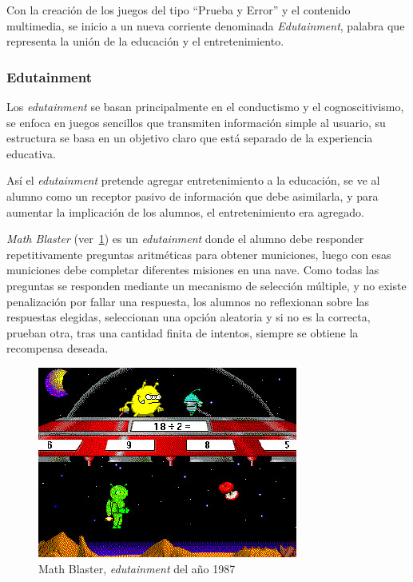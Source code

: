 Con la creación de los juegos del tipo \enquote{Prueba y Error} y el contenido
multimedia, se inicio a un nueva corriente denominada \emph{Edutainment},
palabra que representa la unión de la educación y el entretenimiento. 

\subsubsection{Edutainment}
\label{sec:edutainment}


Los \emph{edutainment} se basan principalmente en el conductismo y el
cognoscitivismo, se enfoca en juegos sencillos que transmiten información simple
al usuario, su estructura se basa en un objetivo claro que está separado de la
experiencia educativa\cite{egenfeldt2007third}. 

Así el \emph{edutainment} pretende agregar entretenimiento a la educación, se
ve al alumno como un receptor pasivo de información que debe asimilarla, y para
aumentar la implicación de los alumnos, el entretenimiento era
agregado\cite{resnick:2004}.


\emph{Math Blaster} (ver~\ref{fig:math_blaster}) es un \emph{edutainment} donde
el alumno debe responder repetitivamente preguntas aritméticas para obtener
municiones, luego con esas municiones debe completar diferentes misiones en una
nave\cite{bruckman1999can}. Como todas las preguntas se responden mediante un
mecanismo de selección múltiple, y no existe penalización por fallar una
respuesta, los alumnos no reflexionan sobre las respuestas elegidas, seleccionan
una opción aleatoria y si no es la correcta, prueban otra, tras una cantidad
finita de intentos, siempre se obtiene la recompensa deseada.

\begin{figure}[ht!] 
\centering 
\includegraphics[scale=0.5,natwidth=296,natheight=217]{tics/images/math_blaster.jpg}
\caption{Math Blaster, \emph{edutainment} del año 1987}
\label{fig:math_blaster} 
\end{figure}

